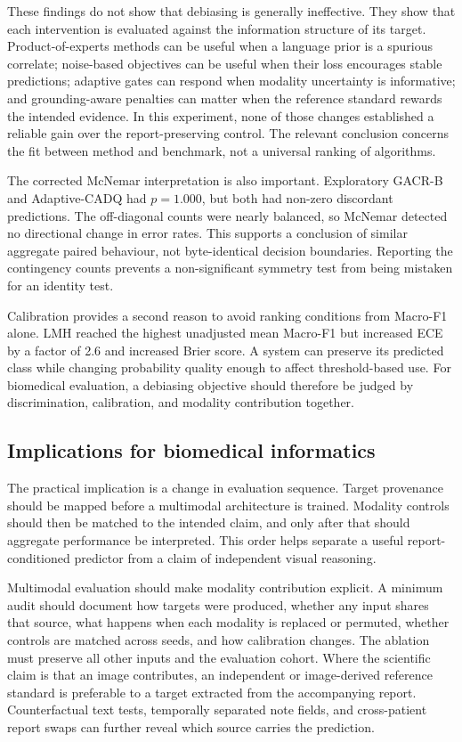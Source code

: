 \documentclass[10pt,a4paper,twocolumn]{article}
\begin{document}
These findings do not show that debiasing is generally ineffective. They show
that each intervention is evaluated against the information structure of its
target. Product-of-experts methods can be useful when a language prior is a
spurious correlate; noise-based objectives can be useful when their loss
encourages stable predictions; adaptive gates can respond when modality
uncertainty is informative; and grounding-aware penalties can matter when the
reference standard rewards the intended evidence. In this experiment, none of
those changes established a reliable gain over the report-preserving control.
The relevant conclusion concerns the fit between method and benchmark, not a
universal ranking of algorithms.

The corrected McNemar interpretation is also important. Exploratory GACR-B and
Adaptive-CADQ had $p=1.000$, but both had non-zero discordant predictions. The
off-diagonal counts were nearly balanced, so McNemar detected no directional
change in error rates. This supports a conclusion of similar aggregate paired
behaviour, not byte-identical decision boundaries. Reporting the contingency
counts prevents a non-significant symmetry test from being mistaken for an
identity test.

Calibration provides a second reason to avoid ranking conditions from Macro-F1
alone. LMH reached the highest unadjusted mean Macro-F1 but increased ECE by a
factor of 2.6 and increased Brier score. A system can preserve its predicted
class while changing probability quality enough to affect threshold-based use.
For biomedical evaluation, a debiasing objective should therefore be judged by
discrimination, calibration, and modality contribution together.

\subsection{Implications for biomedical informatics}\label{sec:implications}

The practical implication is a change in evaluation sequence. Target
provenance should be mapped before a multimodal architecture is trained.
Modality controls should then be matched to the intended claim, and only after
that should aggregate performance be interpreted. This order helps separate a
useful report-conditioned predictor from a claim of independent visual
reasoning.

Multimodal evaluation should make modality contribution explicit. A minimum
audit should document how targets were produced, whether any input shares that
source, what happens when each modality is replaced or permuted, whether
controls are matched across seeds, and how calibration changes. The ablation
must preserve all other inputs and the evaluation cohort. Where the scientific
claim is that an image contributes, an independent or image-derived reference
standard is preferable to a target extracted from the accompanying report.
Counterfactual text tests, temporally separated note fields, and cross-patient
report swaps can further reveal which source carries the prediction.
\end{document}
